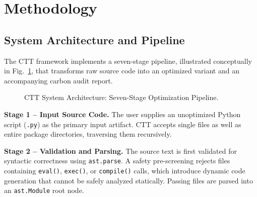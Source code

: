 \documentclass[conference]{IEEEtran}
\begin{document}
\section{Methodology}

\subsection{System Architecture and Pipeline}

The CTT framework implements a seven-stage pipeline, illustrated conceptually
in Fig.~\ref{fig:pipeline}, that transforms raw source code into an optimized
variant and an accompanying carbon audit report.

\begin{figure}[h]
\centering
{}
\caption{CTT System Architecture: Seven-Stage Optimization Pipeline.}
\label{fig:pipeline}
\end{figure}

\textbf{Stage 1 -- Input Source Code.}
The user supplies an unoptimized Python script (\texttt{.py}) as the primary
input artifact.  CTT accepts single files as well as entire package
directories, traversing them recursively.

\textbf{Stage 2 -- Validation and Parsing.}
The source text is first validated for syntactic correctness using
\texttt{ast.parse}.  A safety pre-screening rejects files containing
\texttt{eval()}, \texttt{exec()}, or \texttt{compile()} calls, which
introduce dynamic code generation that cannot be safely analyzed statically.
Passing files are parsed into an \texttt{ast.Module} root node.
\end{document}
